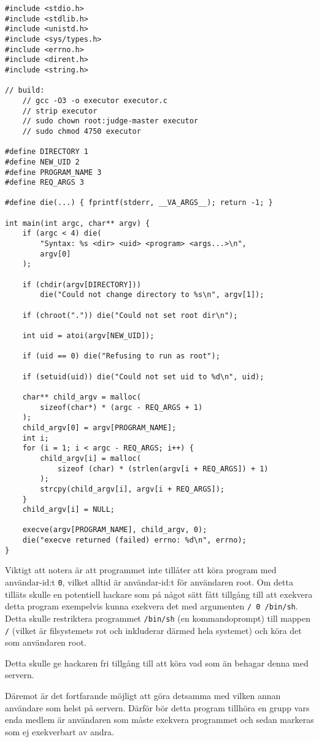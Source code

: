 \documentclass{article}
\begin{document}
\begin{verbatim}
#include <stdio.h>
#include <stdlib.h>
#include <unistd.h>
#include <sys/types.h>
#include <errno.h>
#include <dirent.h>
#include <string.h>

// build:
	// gcc -O3 -o executor executor.c
	// strip executor
	// sudo chown root:judge-master executor
	// sudo chmod 4750 executor

#define DIRECTORY 1
#define NEW_UID 2
#define PROGRAM_NAME 3
#define REQ_ARGS 3

#define die(...) { fprintf(stderr, __VA_ARGS__); return -1; }

int main(int argc, char** argv) {
	if (argc < 4) die(
		"Syntax: %s <dir> <uid> <program> <args...>\n",
		argv[0]
	);

	if (chdir(argv[DIRECTORY]))
		die("Could not change directory to %s\n", argv[1]);

	if (chroot(".")) die("Could not set root dir\n");

	int uid = atoi(argv[NEW_UID]);

	if (uid == 0) die("Refusing to run as root");

	if (setuid(uid)) die("Could not set uid to %d\n", uid);

	char** child_argv = malloc(
		sizeof(char*) * (argc - REQ_ARGS + 1)
	);
	child_argv[0] = argv[PROGRAM_NAME];
	int i;
	for (i = 1; i < argc - REQ_ARGS; i++) {
		child_argv[i] = malloc(
			sizeof (char) * (strlen(argv[i + REQ_ARGS]) + 1)
		);
		strcpy(child_argv[i], argv[i + REQ_ARGS]);
	}
	child_argv[i] = NULL;

	execve(argv[PROGRAM_NAME], child_argv, 0);
	die("execve returned (failed) errno: %d\n", errno);
}
\end{verbatim}

Viktigt att notera är att programmet inte tillåter att köra program med
användar-id:t \texttt{0}, vilket alltid är användar-id:t för användaren root. Om
detta tilläts skulle en potentiell hackare som på något sätt fått tillgång till
att exekvera detta program exempelvis kunna exekvera det med argumenten
\texttt{/ 0 /bin/sh}. Detta skulle restriktera programmet \texttt{/bin/sh}
(en kommandoprompt) till mappen \texttt{/} (vilket är filsystemets rot och
inkluderar därmed hela systemet) och köra det som användaren root.

Detta skulle ge hackaren fri tillgång till att köra vad som än behagar denna med
servern.

Däremot är det fortfarande möjligt att göra detsamma med vilken annan användare
som helst på servern. Därför bör detta program tillhöra en grupp vars enda
medlem är användaren som måste exekvera programmet och sedan markeras som ej
exekverbart av andra.
\end{document}
